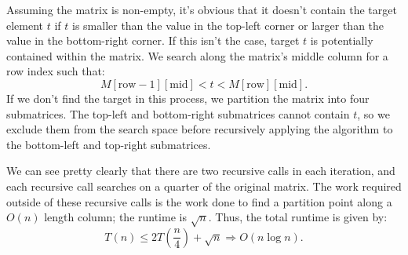 \documentclass[11pt]{article}
\DeclarePairedDelimiter\floor{\lfloor}{\rfloor}
\begin{document}
Assuming the matrix is non-empty, it's obvious that it doesn't contain the target element $t$ if $t$ is smaller than the value in the top-left corner or larger than the value in the bottom-right corner. If this isn't the case, target $t$ is potentially contained within the matrix. We search along the matrix's middle column for a row index such that:
\begin{equation*}
    M[\text{row} - 1][\text{mid}] < t < M[\text{row}][\text{mid}].
\end{equation*}
If we don't find the target in this process, we partition the matrix into four submatrices. The top-left and bottom-right submatrices cannot contain $t$, so we exclude them from the search space before recursively applying the algorithm to the bottom-left and top-right submatrices.

\IncMargin{2em}
\begin{algorithm}[H]
    \footnotesize
    \BlankLine
\end{algorithm}\DecMargin{2em} 

We can see pretty clearly that there are two recursive calls in each iteration, and each recursive call searches on a quarter of the original matrix. The work required outside of these recursive calls is the work done to find a partition point along a $O(n)$ length column; the runtime is $\sqrt{n}$. Thus, the total runtime is given by:
\begin{equation}
    T(n) \leq 2 T \left(\frac{n}{4}\right) + \sqrt{n} \Longrightarrow O(n \log n).
\end{equation}
\end{document}
